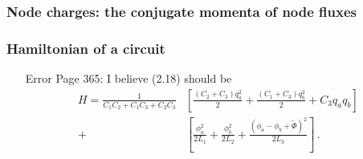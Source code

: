 \subsubsection{Node charges: the conjugate momenta of node fluxes}

\subsubsection{Hamiltonian of a circuit}

\begin{itemize}

\item[Error] Page 365: I believe (2.18) should be
\begin{align}
H = \frac{1}{C_1 C_2 + C_1 C_3 + C_2 C_3} & \left[
\frac{(C_2 + C_3) q_a^2}{2}
+ \frac{(C_1 + C_3)q_b^2}{2}
+ C_3 q_a q_b \right] \nonumber \\
+ & \left[
\frac{\phi_a^2}{2 L_1} + \frac{\phi_b^2}{2 L_2} + \frac{(\phi_a - \phi_b + \tilde{\Phi})^2}{2 L_3} \right] \nonumber \, .
\end{align}

\end{itemize}
